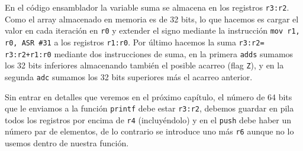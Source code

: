 En el código ensamblador la variable suma se almacena en los registros {\tt r3:r2}.
Como el array almacenado en memoria es de 32 bits, lo que hacemos es cargar el valor
en cada iteración en {\tt r0} y extender el signo mediante la instrucción
{\tt mov r1, r0, ASR \#31} a los registros {\tt r1:r0}. Por último hacemos la suma
{\tt r3:r2= r3:r2+r1:r0} mediante dos instrucciones de suma, en la primera {\tt adds}
sumamos los 32 bits inferiores almacenando también el posible acarreo (flag {\tt Z}),
y en la segunda {\tt adc} sumamos los 32 bits superiores más el acarreo anterior.

Sin entrar en detalles que veremos en el próximo capítulo, el número de 64 bits que
le enviamos a la función {\tt printf} debe estar {\tt r3:r2}, debemos guardar en pila
todos los registros por encima de {\tt r4} (incluyéndolo) y en el {\tt push} debe
haber un número par de elementos, de lo contrario se introduce uno más {\tt r6} aunque
no lo usemos dentro de nuestra función.



\chapterend{}

